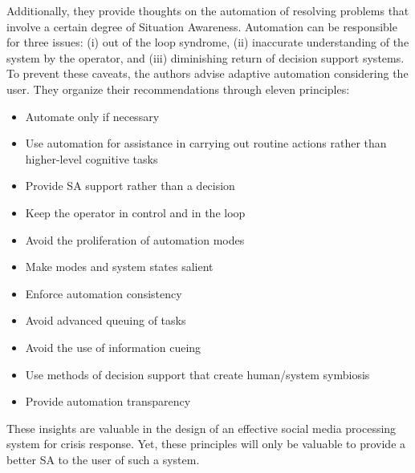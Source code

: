 Additionally, they provide thoughts on the automation of resolving problems that involve a certain degree of Situation Awareness.
Automation can be responsible for three issues: (i) out of the loop syndrome, (ii) inaccurate understanding of the system by the operator, and (iii) diminishing return of decision support systems.
To prevent these caveats, the authors advise adaptive automation considering the user.
They organize their recommendations through eleven principles:

\begin{itemize}
    \item Automate only if necessary
    \item Use automation for assistance in carrying out routine actions rather than higher-level cognitive tasks
    \item Provide SA support rather than a decision
    \item Keep the operator in control and in the loop
    \item Avoid the proliferation of automation modes
    \item Make modes and system states salient
    \item Enforce automation consistency
    \item Avoid advanced queuing of tasks
    \item Avoid the use of information cueing
    \item Use methods of decision support that create human/system symbiosis
    \item Provide automation transparency
\end{itemize}

These insights are valuable in the design of an effective social media processing system for crisis response.
Yet, these principles will only be valuable to provide a better SA to the user of such a system.

